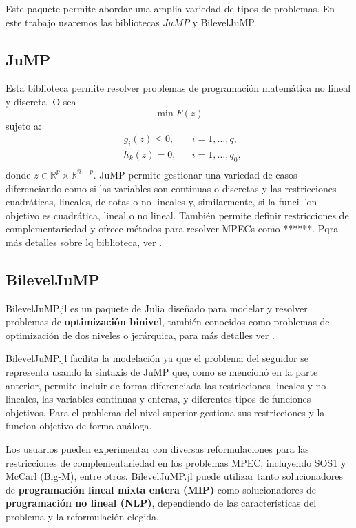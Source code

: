 

Este paquete permite abordar una amplia variedad de tipos de problemas. En este trabajo usaremos las  bibliotecas $JuMP$ y BilevelJuMP.
\subsection*{JuMP}
Esta biblioteca permite resolver problemas de programaci\'on matem\'atica no lineal y discreta. O sea
$$
    \min F(z)$$
sujeto a:
\begin{align}
    & g_i(z) \leq 0, && i = 1,\ldots,q, \\
    & h_k(z)  = 0, && i = 1,\ldots,q_0,\\
\end{align} donde $z\in \mathbb{R}^p\times  \mathbb{R}^{\hat{n}-p}$.
JuMP  permite gestionar una variedad de casos diferenciando como si las variables son continuas o discretas y  las restricciones  cuadráticas, lineales, de cotas o no lineales y, similarmente, si   la funci\ 'on objetivo es cuadrática, lineal o no lineal. También permite definir  restricciones de complementariedad  y ofrece métodos para resolver MPECs como ******.
Pqra m\'as detalles sobre lq biblioteca, ver \cite{JuMPPaper}.
\subsection*{BilevelJuMP}BilevelJuMP.jl es un paquete de Julia diseñado para modelar y resolver problemas de \textbf{optimización binivel}, también conocidos como problemas de optimización de dos niveles o jerárquica, para más detalles ver \cite{BilevelJump}.

BilevelJuMP.jl facilita la modelación ya que el problema del seguidor se representa usando la   sintaxis de JuMP que, como se mencionó en la parte anterior,  permite incluir de forma diferenciada  las restricciones lineales y no lineales, las variables continuas y enteras, y diferentes tipos de  funciones objetivos.
Para el problema del nivel superior gestiona sus restricciones y la funcion objetivo de forma análoga. 

     Los usuarios pueden experimentar con diversas reformulaciones para las restricciones de complementariedad en los problemas MPEC, incluyendo SOS1 y McCarl (Big-M), entre otros.
 BilevelJuMP.jl puede utilizar tanto solucionadores de \textbf{programación lineal mixta entera (MIP)} como solucionadores de \textbf{programación no lineal (NLP)}, dependiendo de las características del problema y la reformulación elegida. 


